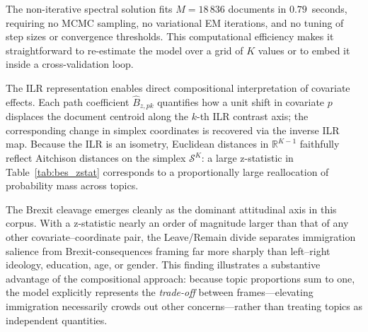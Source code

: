 The non-iterative spectral solution fits $M = 18\,836$ documents in
$0.79$~seconds, requiring no MCMC sampling, no variational EM iterations,
and no tuning of step sizes or convergence thresholds.  This computational
efficiency makes it straightforward to re-estimate the model over a grid
of $K$ values or to embed it inside a cross-validation loop.

The ILR representation enables direct compositional interpretation of
covariate effects.  Each path coefficient $\hat{B}_{z,pk}$ quantifies
how a unit shift in covariate $p$ displaces the document centroid along
the $k$-th ILR contrast axis; the corresponding change in simplex
coordinates is recovered via the inverse ILR map.  Because the ILR is
an isometry, Euclidean distances in $\mathbb{R}^{K-1}$ faithfully
reflect Aitchison distances on the simplex $\mathcal{S}^K$: a large
z-statistic in Table~\ref{tab:bes_zstat} corresponds to a proportionally
large reallocation of probability mass across topics.

The Brexit cleavage emerges cleanly as the dominant attitudinal axis in
this corpus.  With a z-statistic nearly an order of magnitude larger
than that of any other covariate--coordinate pair, the Leave/Remain
divide separates immigration salience from Brexit-consequences framing
far more sharply than left--right ideology, education, age, or gender.
This finding illustrates a substantive advantage of the compositional
approach: because topic proportions sum to one, the model explicitly
represents the \emph{trade-off} between frames---elevating immigration
necessarily crowds out other concerns---rather than treating topics as
independent quantities.
